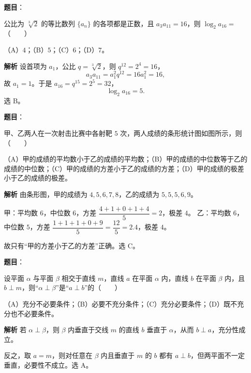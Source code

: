 \begin{answer}

\textbf{题目}：

公比为 $\sqrt[3]{2}$ 的等比数列 $\{a_n\}$ 的各项都是正数，且 $a_3a_{11}=16$，则 $\log_2a_{16}=$\mbox{（　　）}

（A）$4$；（B）$5$；（C）$6$；（D）$7$。

\textbf{解析}
设首项为 $a_1$，公比 $q=\sqrt[3]2$，则 $q^{12}=2^4=16$，
\nopagebreak[4]
\[a_3a_{11}=a_1^2q^{12}=16a_1^2=16,\]
故 $a_1=1$。于是 $a_{16}=q^{15}=2^5=32$，
\nopagebreak[4]
\[\log_2a_{16}=5.\]
选 B。


\end{answer}
\begin{answer}

\textbf{题目}：

甲、乙两人在一次射击比赛中各射靶 $5$ 次，两人成绩的条形统计图如图所示，则\mbox{（　　）}
\nopagebreak[4]
\begin{center}\end{center}
\nopagebreak[4]
（A）甲的成绩的平均数小于乙的成绩的平均数；（B）甲的成绩的中位数等于乙的成绩的中位数；（C）甲的成绩的方差小于乙的成绩的方差；（D）甲的成绩的极差小于乙的成绩的极差。

\textbf{解析}
由条形图，甲的成绩为 $4,5,6,7,8$，乙的成绩为 $5,5,5,6,9$。

甲：平均数 $6$，中位数 $6$，方差 $\dfrac{4+1+0+1+4}5=2$，极差 $4$。
乙：平均数 $6$，中位数 $5$，方差 $\dfrac{1+1+1+0+9}5=\dfrac{12}5=2.4$，极差 $4$。

故只有“甲的方差小于乙的方差”正确。选 C。


\end{answer}
\begin{answer}

\textbf{题目}：

设平面 $\alpha$ 与平面 $\beta$ 相交于直线 $m$，直线 $a$ 在平面 $\alpha$ 内，直线 $b$ 在平面 $\beta$ 内，且 $b\perp m$，则“$\alpha\perp\beta$”是“$a\perp b$”的\mbox{（　　）}

（A）充分不必要条件；（B）必要不充分条件；（C）充分必要条件；（D）既不充分也不必要条件。

\textbf{解析}
若 $\alpha\perp\beta$，则 $\beta$ 内垂直于交线 $m$ 的直线 $b$ 垂直于 $\alpha$，从而 $b\perp a$，充分性成立。

反之，取 $a=m$，则对任意在 $\beta$ 内且垂直于 $m$ 的 $b$ 都有 $a\perp b$，但两平面不一定垂直，必要性不成立。选 A。


\end{answer}
